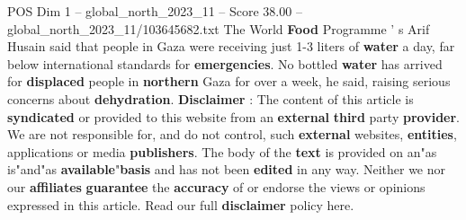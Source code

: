 \begin{textsample}{POS Dim 1 – global\_north\_2023\_11 – Score 38.00 – global\_north\_2023\_11/103645682.txt}
The World \textbf{Food} Programme ' s Arif Husain said that people in Gaza were receiving just 1-3 liters of \textbf{water} a day, far below international standards for \textbf{emergencies}.
No bottled \textbf{water} has arrived for \textbf{displaced} people in \textbf{northern} Gaza for over a week, he said, raising serious concerns about \textbf{dehydration}. \textbf{Disclaimer} : The content of this article is \textbf{syndicated} or provided to this website from an \textbf{external} \textbf{third} party \textbf{provider}.
We are not responsible for, and do not control, such \textbf{external} websites, \textbf{entities}, applications or media \textbf{publishers}.
The body of the \textbf{text} is provided on an"as is"and"as \textbf{available}"\textbf{basis} and has not been \textbf{edited} in any way.
Neither we nor our \textbf{affiliates} \textbf{guarantee} the \textbf{accuracy} of or endorse the views or opinions expressed in this article.
Read our full \textbf{disclaimer} policy here.

\end{textsample}
